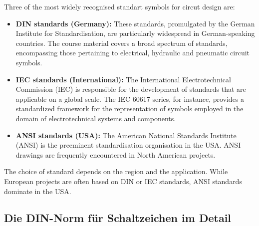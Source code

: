 Three of the most widely recognised standart symbols for circut design are:
\begin{itemize}
\item \textbf{DIN standards (Germany): }These standards, promulgated by the German Institute for Standardisation, are particularly widespread in German-speaking countries. The course material covers a broad spectrum of standards, encompassing those pertaining to electrical, hydraulic and pneumatic circuit symbols.
\item \textbf{IEC standards (International):} The International Electrotechnical Commission (IEC) is responsible for the development of standards that are applicable on a global scale. The IEC 60617 series, for instance, provides a standardized framework for the representation of symbols employed in the domain of electrotechnical systems and components.
\item \textbf{ANSI standards (USA):} The American National Standards Institute (ANSI) is the preeminent standardisation organisation in the USA. ANSI drawings are frequently encountered in North American projects.
\end{itemize}
The choice of standard depends on the region and the application. While European projects are often based on DIN or IEC standards, ANSI standards dominate in the USA.

\subsection*{Die DIN-Norm für Schaltzeichen im Detail}

